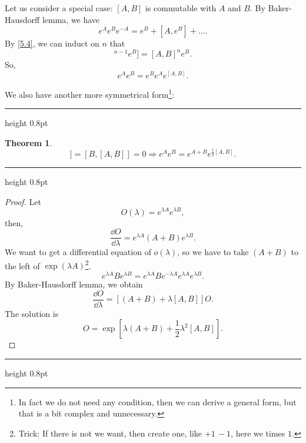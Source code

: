 \documentclass{article}
\newcommand{\singleline}{\hrule height 0.8pt}
\theoremstyle{1}
\newtheorem{theorem}[problem]{Theorem}
\begin{document}
Let us consider a special case: $[A,B]$ is  commutable with $A$ and $B$. By Baker-Hausdorff lemma, we have
\begin{equation}
    e^Ae^Be^{-A}=e^B+[A,e^B]+\dots.
\end{equation}
By \eqref{5.4}, we can induct on $n$ that 
\begin{equation}
    [A,[A,B]^{n-1}e^B]=[A,B]^ne^B.
\end{equation}
So, 
\begin{equation}
    e^Ae^B=e^Be^Ae^{[A,B]}.
\end{equation}


We also have another more symmetrical form\footnote{In fact we do not need any condition, then we can derive a general form, but that is a bit complex and unnecessary.}:

\singleline

\begin{theorem}

    \begin{equation}
         [A,[A,B]]=[B,[A,B]]=0\Rightarrow e^A e^B = e^{A + B} e^{\frac{1}{2}[A, B]}.
    \end{equation}
\end{theorem}
\singleline
\begin{proof}
    Let 
    \begin{equation}
        O(\lambda)=e^{\lambda A}e^{\lambda B},
    \end{equation}
    then,
    \begin{equation}
        \frac{\dd{O}}{\dd{\lambda}}=e^{\lambda A}\left(A+B\right)e^{\lambda B}.
    \end{equation}
    We want to get a differential equation of $o(\lambda)$, so we have to take $(A+B)$ to the left of $\exp(\lambda A)$\footnote{Trick: If there is not we want, then create one, like $+1\, -1$, here we times $1$.}.
    \begin{equation}
        e^{\lambda A}Be^{\lambda B}=e^{\lambda A}Be^{-\lambda A}e^{\lambda A}e^{\lambda B}.
    \end{equation}
    By Baker-Hausdorff lemma, we obtain
    \begin{equation}
        \frac{\dd{O}}{\dd{\lambda}}=\left[\left(A+B\right)+\lambda[A,B]\right]O.
    \end{equation}
    The solution is 
    \begin{equation}
        O=\exp\left[\lambda(A+B)+\frac{1}{2}\lambda^2[A,B]\right].
    \end{equation}
\end{proof}
\singleline
\end{document}
